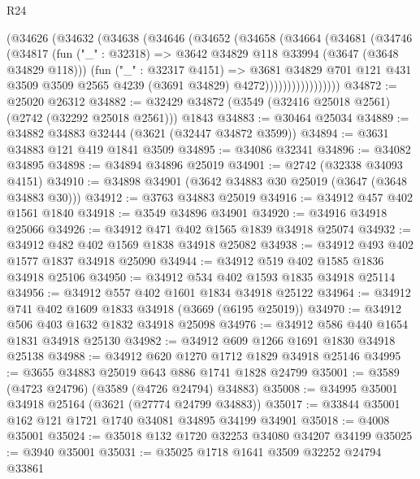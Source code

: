 \begin{lexlean}{R24}
\begin{coremodule}
                (@34626
                  (@34632
                    (@34638
                      (@34646
                        (@34652
                          (@34658
                            (@34664
                              (@34681
                                (@34746
                                  (@34817
                                    (fun ("_" : @32318) =>
                                    @3642 @34829 @118 @33994 (@3647 (@3648 @34829 @118)))
                                    (fun ("_" : @32317 @4151) =>
                                    @3681
                                      @34829
                                      @701
                                      @121
                                      @431
                                      @3509
                                      @3509
                                      @2565
                                      @4239
                                      (@3691 @34829)
                                      @4272)))))))))))))))))
@34872 := @25020 @26312
@34882 := @32429 @34872 (@3549 (@32416 @25018 @2561) (@2742 (@32292 @25018 @2561))) @1843
@34883 := @30464 @25034
@34889 := @34882 @34883 @32444 (@3621 (@32447 @34872 @3599))
@34894 := @3631 @34883 @121 @419 @1841 @3509
@34895 := @34086 @32341
@34896 := @34082 @34895
@34898 := @34894 @34896 @25019
@34901 := @2742 (@32338 @34093 @4151)
@34910 := @34898 @34901 (@3642 @34883 @30 @25019 (@3647 (@3648 @34883 @30)))
@34912 := @3763 @34883 @25019
@34916 := @34912 @457 @402 @1561 @1840
@34918 := @3549 @34896 @34901
@34920 := @34916 @34918 @25066
@34926 := @34912 @471 @402 @1565 @1839 @34918 @25074
@34932 := @34912 @482 @402 @1569 @1838 @34918 @25082
@34938 := @34912 @493 @402 @1577 @1837 @34918 @25090
@34944 := @34912 @519 @402 @1585 @1836 @34918 @25106
@34950 := @34912 @534 @402 @1593 @1835 @34918 @25114
@34956 := @34912 @557 @402 @1601 @1834 @34918 @25122
@34964 := @34912 @741 @402 @1609 @1833 @34918 (@3669 (@6195 @25019))
@34970 := @34912 @506 @403 @1632 @1832 @34918 @25098
@34976 := @34912 @586 @440 @1654 @1831 @34918 @25130
@34982 := @34912 @609 @1266 @1691 @1830 @34918 @25138
@34988 := @34912 @620 @1270 @1712 @1829 @34918 @25146
@34995 := @3655 @34883 @25019 @643 @886 @1741 @1828 @24799
@35001 := @3589 (@4723 @24796) (@3589 (@4726 @24794) @34883)
@35008 := @34995 @35001 @34918 @25164 (@3621 (@27774 @24799 @34883))
@35017 := @33844 @35001 @162 @121 @1721 @1740 @34081 @34895 @34199 @34901
@35018 := @4008 @35001
@35024 := @35018 @132 @1720 @32253 @34080 @34207 @34199
@35025 := @3940 @35001
@35031 := @35025 @1718 @1641 @3509 @32252 @24794 @33861

\end{coremodule}
\end{lexlean}
